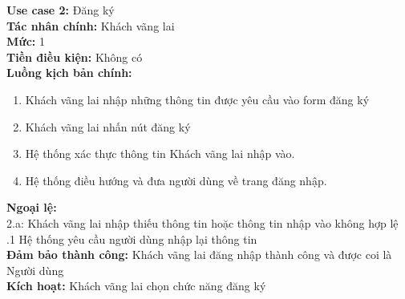 \begin{boxed}
	\textbf{Use case 2:} Đăng ký                                                               \\
	\textbf{Tác nhân chính:} Khách vãng lai                                                    \\
	\textbf{Mức:} 1                                                                            \\
	\textbf{Tiền điều kiện:} Không có                                                          \\
	\textbf{Luồng kịch bản chính:}                                                             \\
	\begin{enumerate}
		\vspace{-2em}
		\itemsep-0.5em
		\item Khách vãng lai nhập những thông tin được yêu cầu vào form đăng ký
		\item Khách vãng lai nhấn nút đăng ký
		\item Hệ thống xác thực thông tin Khách vãng lai nhập vào.
		\item Hệ thống điều hướng và đưa người dùng về trang đăng nhập.
		      \vspace{-1em}
	\end{enumerate}
	\textbf{Ngoại lệ:}                                                                         \\
	\hspace{1em}2.a: Khách vãng lai nhập thiếu thông tin hoặc thông tin nhập vào không hợp lệ  \\
	\hspace{2.5em}.1 Hệ thống yêu cầu người dùng nhập lại thông tin                            \\
	\textbf{Đảm bảo thành công:} Khách vãng lai đăng nhập thành công và được coi là Người dùng \\
	\textbf{Kích hoạt:} Khách vãng lai chọn chức năng đăng ký
\end{boxed}

